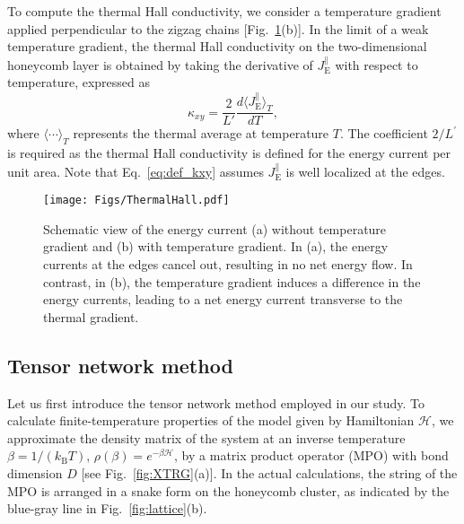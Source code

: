 \documentclass[twocolumn,superscriptaddress,showpacs, longbibliography, aps, prx]{revtex4-2}
\begin{document}
To compute the thermal Hall conductivity, we consider a temperature gradient applied perpendicular to the zigzag chains [Fig.~\ref{fig:ThermalHall}(b)]. 
In the limit of a weak temperature gradient, the thermal Hall conductivity on the two-dimensional honeycomb layer is obtained by taking the derivative of $J_{\mathrm{E}}^{\parallel}$ with respect to temperature, 
expressed as 
\begin{equation}
 \kappa_{xy}=\frac{2}{L'} \frac{d \langle J_{\mathrm{E}}^{\parallel}\rangle_{T}}{d T},
\label{eq:def_kxy}
\end{equation}
where $\langle \cdots \rangle_T$ represents the thermal average at temperature $T$.
The coefficient $2/L^\prime$ is required as the thermal Hall conductivity is defined for the energy current per unit area. 
Note that Eq.~\eqref{eq:def_kxy} assumes $J_{\mathrm{E}}^\parallel$ is well localized at the edges. 

\begin{figure}
  \begin{center}
    \texttt{[image: Figs/ThermalHall.pdf]}    
  \end{center}
  \caption{
    Schematic view of the energy current (a) without temperature gradient and (b) with temperature gradient. 
    In (a), the energy currents at the edges cancel out, resulting in no net energy flow. 
    In contrast, in (b), the temperature gradient induces a difference in the energy currents, leading to a net energy current transverse to the thermal gradient.
  }
  \label{fig:ThermalHall}
\end{figure}


\subsection{Tensor network method}\label{subsec:Tensor network method}
Let us first introduce the tensor network method employed in our study. 
To calculate finite-temperature properties of the model given by Hamiltonian $\mathcal{H}$, we approximate the density matrix of the system at an inverse temperature $\beta = 1/(k_{\mathrm{B}} T)$, $\rho(\beta) = e^{-\beta\mathcal{H}}$, by a matrix product operator (MPO) with bond dimension $D$ [see Fig.~\ref{fig:XTRG}(a)]. In the actual calculations, the string of the MPO is arranged in a snake form on the honeycomb cluster, as indicated by the blue-gray line in Fig.~\ref{fig:lattice}(b). 
\end{document}
